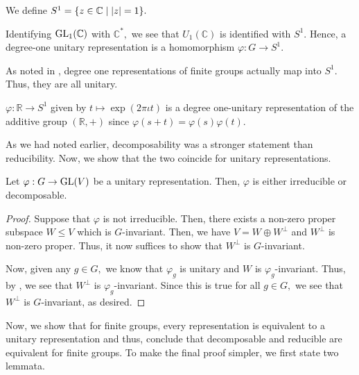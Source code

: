 \begin{defn}
	We define $S^1 = \{z \in \mathbb{C} \mid {\left\lvert z \right\lvert} = 1\}.$
\end{defn}

Identifying $\operatorname{GL}_1(\mathbb{C})$ with $\mathbb{C}^*,$ we see that $U_1(\mathbb{C})$ is identified with $S^1.$ Hence, a degree-one unitary representation is a homomorphism $\varphi:G \to S^1.$

\begin{rem} \label{rem:findegoneunitary}
	As noted in , degree one representations of finite groups actually map into $S^1.$ Thus, they are all unitary.
\end{rem}

\begin{ex}
	$\varphi:\mathbb{R}\to S^1$ given by $t \mapsto \exp(2\pi\iota t)$ is a degree one-unitary representation of the additive group $(\mathbb{R}, +)$ since $\varphi(s + t) = \varphi(s)\varphi(t).$
\end{ex}

As we had noted earlier, decomposability was a stronger statement than reducibility. Now, we show that the two coincide for unitary representations.

\begin{prop} \label{prop:unitirredordecom}
	Let $\varphi:G \to \operatorname{GL}(V)$ be a unitary representation. Then, $\varphi$ is either irreducible or decomposable.
\end{prop}
\begin{proof} 
	Suppose that $\varphi$ is not irreducible. Then, there exists a non-zero proper subspace $W \le V$ which is $G$-invariant. Then, we have $V = W \oplus W^{\perp}$ and $W^{\perp}$ is non-zero proper. Thus, it now suffices to show that $W^\perp$ is $G$-invariant.

	Now, given any $g \in G,$ we know that $\varphi_g$ is unitary and $W$ is $\varphi_g$-invariant. Thus, by , we see that $W^\perp$ is $\varphi_g$-invariant. Since this is true for all $g \in G,$ we see that $W^\perp$ is $G$-invariant, as desired.
\end{proof}

Now, we show that for finite groups, every representation is equivalent to a unitary representation and thus, conclude that decomposable and reducible are equivalent for finite groups. To make the final proof simpler, we first state two lemmata.

